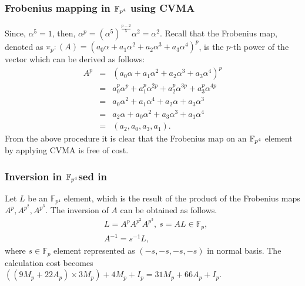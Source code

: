 \subsubsection{Frobenius mapping in \texorpdfstring{$\mathbb{F}_{p^4}$}{} using CVMA}
Since, $\alpha^5=1$, then, $\alpha^p=(\alpha^5)^{\frac{p-2}{5} }\alpha^2=\alpha^2$. 
Recall that the Frobenius map, denoted as $\pi_p : (A) = (a_0 \alpha +a_1\alpha^2+a_2\alpha^3+a_3\alpha^4)^p$, is the $p$-th power of the vector which can be derived as follows:
\begin{eqnarray}
	A^p & = & (a_0\alpha+ a_1\alpha^2 + a_2\alpha^3 +a_3\alpha^4)^p \nonumber\\ 
	    & = & a_0^p\alpha^p+ a_1^p\alpha^{2p} + a_2^p\alpha^{3p} +a_3^p\alpha^{4p}\nonumber\\ 
	    & = & a_0\alpha^2+ a_1\alpha^{4} + a_2\alpha +a_3\alpha^{3}\nonumber \\ 
		& = & a_2\alpha+ a_0\alpha^{2} + a_3\alpha^3 +a_1\alpha^{4} \nonumber \\ 
		& = & (a_2, a_0, a_3,a_1) \label{fp4frob}.
\end{eqnarray}
From the above procedure it is clear that the Frobenius map on an $\mathbb{F}_{p^4}$ element by applying CVMA is free of cost.

\subsubsection{Inversion in \texorpdfstring{$\mathbb{F}_{p^4}$} used in \texorpdfstring{\cite{cvma_sanada}}{}}
Let $L$ be an $\mathbb{F}_{p^4}$ element, which is the result of the product of the Frobenius maps $A^p, A^{p^2}, A^{p^3}$.
The inversion of $A$ can be obtained as follows.
\begin{eqnarray}
&L=A^p A^{p^2} A^{p^3}, ~ s=AL \in \mathbb{F}_p, \nonumber \\
&A^{-1}=s^{-1}L, \nonumber
\end{eqnarray}
where $s \in \mathbb{F}_p$ element represented as $(-s,-s,-s,-s)$ in normal basis.
The calculation cost becomes $((9M_p+22A_p)\times3M_p)+4M_p+I_p=31M_p+66A_p+I_p$.
